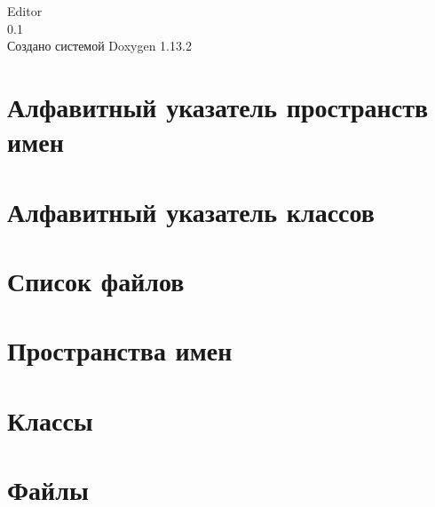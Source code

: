 \documentclass[twoside]{book}
\newcommand{\+}{\discretionary{\mbox{\scriptsize$\hookleftarrow$}}{}{}}
\newcommand{\clearemptydoublepage}{%
    \newpage{\pagestyle{empty}\cleardoublepage}%
  }
\begin{document}
  \raggedbottom
    \hypersetup{pageanchor=false,
                bookmarksnumbered=true,
                pdfencoding=unicode
               }
  \begin{titlepage}
  \vspace*{7cm}
  \begin{center}%
  {\Large Editor}\\
  [1ex]\large 0.\+1 \\
  \vspace*{1cm}
  {\large Создано системой Doxygen 1.13.2}\\
  \end{center}
  \end{titlepage}
  \clearemptydoublepage
  \tableofcontents
  \clearemptydoublepage
  \hypersetup{pageanchor=true}

\chapter{Алфавитный указатель пространств имен}

\chapter{Алфавитный указатель классов}

\chapter{Список файлов}

\chapter{Пространства имен}






\chapter{Классы}





\chapter{Файлы}

  \backmatter
  \newpage
  \clearemptydoublepage
  \printindex
\end{document}
